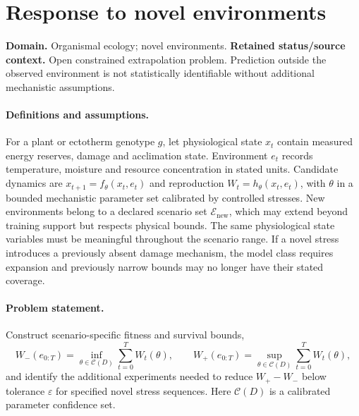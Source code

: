 \documentclass[11pt]{article}
\begin{document}
\section*{Response to novel environments}
\label{prob:182}
\label{rank:94}
\par\smallskip

\noindent\textbf{Domain.} Organismal ecology; novel environments. \quad \textbf{Retained status/source context.} Open constrained extrapolation problem. Prediction outside the observed environment is not statistically identifiable without additional mechanistic assumptions.
\paragraph{Definitions and assumptions.} For a plant or ectotherm genotype $g$, let physiological state $x_t$ contain measured energy reserves, damage and acclimation state. Environment $e_t$ records temperature, moisture and resource concentration in stated units. Candidate dynamics are $x_{t+1}=f_\theta(x_t,e_t)$ and reproduction $W_t=h_\theta(x_t,e_t)$, with $\theta$ in a bounded mechanistic parameter set calibrated by controlled stresses. New environments belong to a declared scenario set $\mathcal E_{\mathrm{new}}$, which may extend beyond training support but respects physical bounds. The same physiological state variables must be meaningful throughout the scenario range. If a novel stress introduces a previously absent damage mechanism, the model class requires expansion and previously narrow bounds may no longer have their stated coverage.
\paragraph{Problem statement.} Construct scenario-specific fitness and survival bounds,
\[
 W_-(e_{0:T})=\inf_{\theta\in\mathcal C(D)}\sum_{t=0}^T W_t(\theta),
 \qquad W_+(e_{0:T})=\sup_{\theta\in\mathcal C(D)}\sum_{t=0}^T W_t(\theta),
\]
and identify the additional experiments needed to reduce $W_+-W_-$ below tolerance $\varepsilon$ for specified novel stress sequences. Here $\mathcal C(D)$ is a calibrated parameter confidence set.
\end{document}
